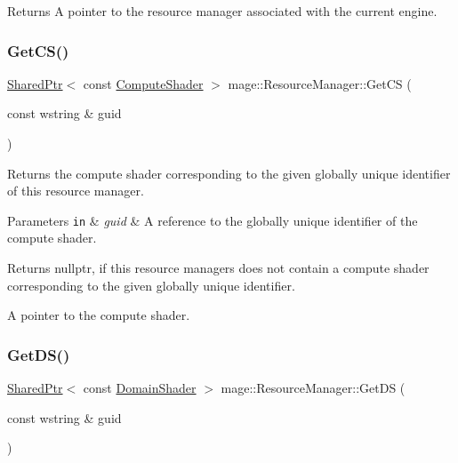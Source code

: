 \begin{DoxyReturn}{Returns}
A pointer to the resource manager associated with the current engine. 
\end{DoxyReturn}
\hypertarget{classmage_1_1_resource_manager_a87967af3f0896373023c858db4a8307b}{}\label{classmage_1_1_resource_manager_a87967af3f0896373023c858db4a8307b} 
\subsubsection{\texorpdfstring{Get\+C\+S()}{GetCS()}}
{\footnotesize\ttfamily \hyperlink{namespacemage_a1e01ae66713838a7a67d30e44c67703e}{Shared\+Ptr}$<$ const \hyperlink{namespacemage_af219172e81f21ea8002b17b1efbb25e0}{Compute\+Shader} $>$ mage\+::\+Resource\+Manager\+::\+Get\+CS (\begin{DoxyParamCaption}\item[{const wstring \&}]{guid }\end{DoxyParamCaption})\hspace{0.3cm}{\ttfamily [noexcept]}}

Returns the compute shader corresponding to the given globally unique identifier of this resource manager.


\begin{DoxyParams}[1]{Parameters}
\mbox{\tt in}  & {\em guid} & A reference to the globally unique identifier of the compute shader. \\
\hline
\end{DoxyParams}
\begin{DoxyReturn}{Returns}
{\ttfamily nullptr}, if this resource managers does not contain a compute shader corresponding to the given globally unique identifier. 

A pointer to the compute shader. 
\end{DoxyReturn}
\hypertarget{classmage_1_1_resource_manager_a8456ada6f4938fb1c8220cfe988ad8a7}{}\label{classmage_1_1_resource_manager_a8456ada6f4938fb1c8220cfe988ad8a7} 
\subsubsection{\texorpdfstring{Get\+D\+S()}{GetDS()}}
{\footnotesize\ttfamily \hyperlink{namespacemage_a1e01ae66713838a7a67d30e44c67703e}{Shared\+Ptr}$<$ const \hyperlink{namespacemage_ad5d9bb50a2b73d471275badcd9b2f155}{Domain\+Shader} $>$ mage\+::\+Resource\+Manager\+::\+Get\+DS (\begin{DoxyParamCaption}\item[{const wstring \&}]{guid }\end{DoxyParamCaption})\hspace{0.3cm}{\ttfamily [noexcept]}}

